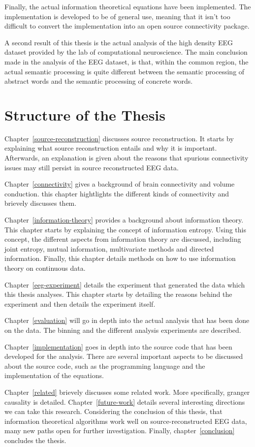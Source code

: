 Finally, the actual information theoretical equations have been implemented. The implementation is developed to be of general use, meaning that it isn't too difficult to convert the implementation into an open source connectivity package.

A second result of this thesis is the actual analysis of the high density EEG dataset provided by the lab of computational neuroscience. The main conclusion made in the analysis of the EEG dataset, is that, within the common region, the actual semantic processing is quite different between the semantic processing of abstract words and the semantic processing of concrete words.

\section{Structure of the Thesis}

Chapter~\ref{source-reconstruction} discusses source reconstruction. It starts by explaining what source reconstruction entails and why it is important. Afterwards, an explanation is given about the reasons that spurious connectivity issues may still persist in source reconstructed EEG data.

Chapter~\ref{connectivity} gives a background of brain connectivity and volume conduction. this chapter hightlights the different kinds of connectivity and brievely discusses them.

Chapter~\ref{information-theory} provides a background about information theory. This chapter starts by explaining the concept of information entropy. Using this concept, the different aspects from information theory are discussed, including joint entropy, mutual information, multivariate methods and directed information. Finally, this chapter details methods on how to use information theory on continuous data.

Chapter~\ref{eeg-experiment} details the experiment that generated the data which this thesis analyses. This chapter starts by detailing the reasons behind the experiment and then details the experiment itself.

Chapter~\ref{evaluation} will go in depth into the actual analysis that has been done on the data. The binning and the different analysis experiments are described. 

Chapter~\ref{implementation} goes in depth into the source code that has been developed for the analysis. There are several important aspects to be discussed about the source code, such as the programming language and the implementation of the equations.

Chapter~\ref{related} brievely discusses some related work. More specifically, granger causality is detailed. Chapter~\ref{future-work} details several interesting directions we can take this research. Considering the conclusion of this thesis, that information theoretical algorithms work well on source-reconstructed EEG data, many new paths open for further investigation. Finally, chapter~\ref{conclusion} concludes the thesis.